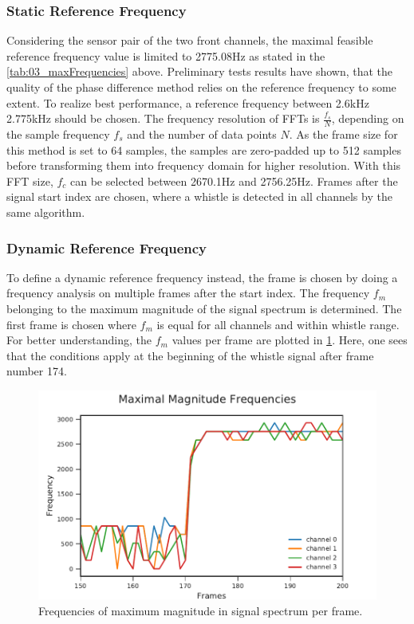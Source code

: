 \subsubsection*{Static Reference Frequency}

Considering the sensor pair of the two front channels, the maximal feasible
reference frequency value is limited to 2775.08\si{\hertz} as stated in the \cref{tab:03_maxFrequencies} above.
Preliminary tests results have shown, that the quality of the phase difference
method relies on the reference frequency to some extent.
To realize best performance, a reference frequency between 2.6\si{\kilo\hertz} 2.775\si{\kilo\hertz}
should be chosen.
The frequency resolution of \acp{FFT} is $\frac{f_s}{N}$, depending on the sample frequency $f_s$ and
the number of data points $N$.
As the frame size for this method is set to 64 samples, the samples are zero-padded
up to 512 samples before transforming them into frequency domain for higher resolution.
With this \ac{FFT} size, $f_c$ can be selected between 2670.1\si{\hertz} and 2756.25\si{\hertz}.
Frames after the signal start index are chosen, where a whistle is detected
in all channels by the same algorithm.

\subsubsection*{Dynamic Reference Frequency}

To define a dynamic reference frequency instead, the frame is chosen by doing a frequency analysis on
multiple frames after the start index.
The frequency $f_m$ belonging to the maximum magnitude of the signal spectrum
is determined.
The first frame is chosen where $f_m$ is equal for all channels and
within whistle range.
For better understanding, the $f_m$ values per frame are plotted in \cref{fig:03_maxFreq}.
Here, one sees that the conditions apply at the beginning of the whistle signal after frame number 174.

\begin{figure}[ht]
	\centering
		\includegraphics[]{figures/maxFreq}
	\caption{Frequencies of maximum magnitude in signal spectrum per frame.}
    \label{fig:03_maxFreq}
\end{figure}
